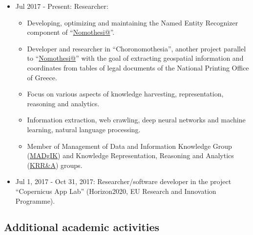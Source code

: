 \documentclass[a4paper,oneside,11pt]{article}
\begin{document}
\begin{itemize}

\item Jul 2017 - Present: Researcher:
	\begin{itemize}

	\item Developing, optimizing and maintaining the Named Entity Recognizer component of ``\href{http://legislation.di.uoa.gr}{Nomothesi@}''.

	\item Developer and researcher in ``Choronomothesia'', another project parallel to ``\href{http://legislation.di.uoa.gr}{Nomothesi@}'' with the goal 
	of extracting geospatial information and coordinates from tables of legal documents of the National Printing Office of Greece.

	\item Focus on various aspects of knowledge harvesting, representation, reasoning and analytics.

	\item Information extraction, web crawling, deep neural networks and machine learning, natural language processing.

	\item Member of Management of Data and Information Knowledge Group (\href{http://www.madgik.di.uoa.gr}{MADgIK}) and Knowledge Representation, Reasoning and Analytics (\href{http://kr.di.uoa.gr/}{KRR\&A}) groups.

	\end{itemize}

\item Jul 1, 2017 - Oct 31, 2017: Researcher/software developer in the project ``Copernicus App Lab'' (Horizon2020, EU Research and Innovation Programme).

\end{itemize}

\subsection*{Additional academic activities}
\end{document}
